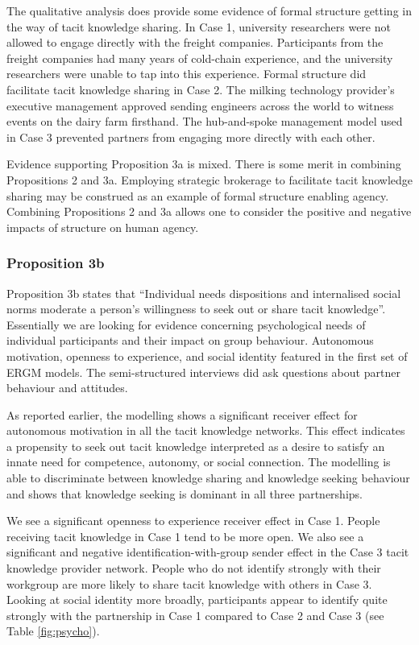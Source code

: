 The qualitative analysis does provide some evidence of formal structure getting in the way of tacit knowledge sharing. In Case 1, university researchers were not allowed to engage directly with the freight companies. Participants from the freight companies had many years of cold-chain experience, and the university researchers were unable to tap into this experience. Formal structure did facilitate tacit knowledge sharing in Case 2. The milking technology provider's executive management approved sending engineers across the world to witness events on the dairy farm firsthand. The hub-and-spoke management model used in Case 3 prevented partners from engaging more directly with each other. \medskip

Evidence supporting Proposition 3a is mixed. There is some merit in combining Propositions 2 and 3a. Employing strategic brokerage to facilitate tacit knowledge sharing may be construed as an example of formal structure enabling agency. Combining Propositions 2 and 3a allows one to consider the positive and negative impacts of structure on human agency. 

\subsubsection{Proposition 3b}

Proposition 3b states that \enquote{Individual needs dispositions and internalised social norms moderate a person's willingness to seek out or share tacit knowledge}. Essentially we are looking for evidence concerning psychological needs of individual participants and their impact on group behaviour. Autonomous motivation, openness to experience, and social identity featured in the first set of ERGM models. The semi-structured interviews did ask questions about partner behaviour and attitudes. \medskip 

As reported earlier, the modelling shows a significant receiver effect for autonomous motivation in all the tacit knowledge networks. This effect indicates a propensity to seek out tacit knowledge interpreted as a desire to satisfy an innate need for competence, autonomy, or social connection. The modelling is able to discriminate between knowledge sharing and knowledge seeking behaviour and shows that knowledge seeking is dominant in all three partnerships. \medskip

We see a significant openness to experience receiver effect in Case 1. People receiving tacit knowledge in Case 1 tend to be more open. We also see a significant and negative identification-with-group sender effect in the Case 3 tacit knowledge provider network. People who do not identify strongly with their workgroup are more likely to share tacit knowledge with others in Case 3. Looking at social identity more broadly, participants appear to identify quite strongly with the partnership in Case 1 compared to Case 2 and Case 3 (see Table \ref{fig:psycho}). \medskip

